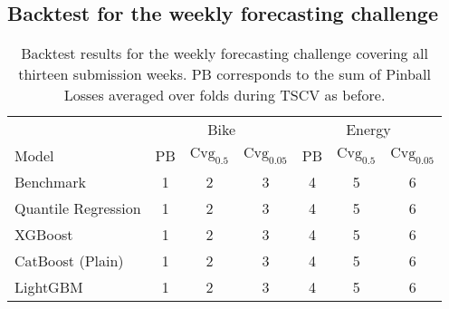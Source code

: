 \lipsum[1-7]

\subsection{Backtest for the weekly forecasting challenge}
\label{sec:Results:Backtest}

\lipsum[1-3]

\begin{table}[h]
    \centering
    \begin{tabular}{@{}lcccccc@{}}
        \toprule
        & \multicolumn{3}{c}{Bike} & \multicolumn{3}{c}{Energy} \\
        \cmidrule(lr){2-4} \cmidrule(lr){5-7}
        Model & PB & $\text{Cvg}_{0.5}$ & $\text{Cvg}_{0.05}$ & PB & $\text{Cvg}_{0.5}$ & $\text{Cvg}_{0.05}$ \\
        \midrule
        Benchmark & 1 & 2 & 3 & 4 & 5 & 6 \\
        Quantile Regression & 1 & 2 & 3 & 4 & 5 & 6 \\
        XGBoost & 1 & 2 & 3 & 4 & 5 & 6 \\
        CatBoost (Plain) & 1 & 2 & 3 & 4 & 5 & 6 \\
        LightGBM & 1 & 2 & 3 & 4 & 5 & 6 \\
        \bottomrule
    \end{tabular}
    \caption{Backtest results for the weekly forecasting challenge covering all thirteen submission weeks. PB corresponds to the sum of Pinball Losses averaged over folds during TSCV as before.}
    \label{tab:challenge-backtest}
\end{table}

\lipsum[1-2]